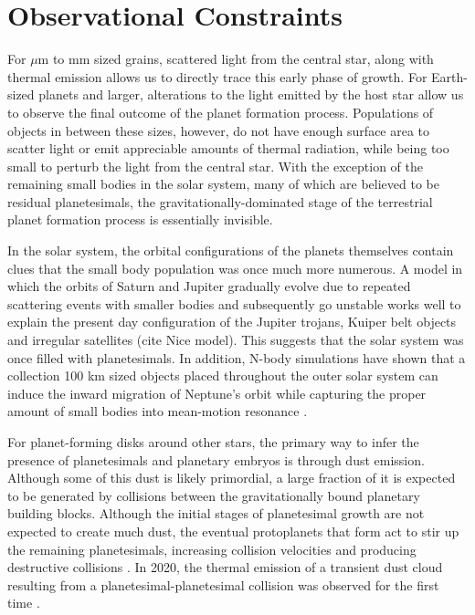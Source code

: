 \section{Observational Constraints}\label{sec:obsConstraints}

For $\mu$m to mm sized grains, scattered light from the central star, along with thermal emission allows us to directly trace this early phase of growth. For Earth-sized planets and larger, alterations to the light emitted by the host star allow us to observe the final outcome of the planet formation process. Populations of objects in between these sizes, however, do not have enough surface area to scatter light or emit appreciable amounts of thermal radiation, while being too small to perturb the light from the central star. With the exception of the remaining small bodies in the solar system, many of which are believed to be residual planetesimals, the gravitationally-dominated stage of the terrestrial planet formation process is essentially invisible.

In the solar system, the orbital configurations of the planets themselves contain clues that the small body population was once much more numerous. A model in which the orbits of Saturn and Jupiter gradually evolve due to repeated scattering events with smaller bodies and subsequently go unstable works well to explain the present day configuration of the Jupiter trojans, Kuiper belt objects and irregular satellites (cite Nice model). This suggests that the solar system was once filled with planetesimals. In addition, N-body simulations have shown that a collection 100 km sized objects placed throughout the outer solar system can induce the inward migration of Neptune's orbit while capturing the proper amount of small bodies into mean-motion resonance \cite{murrayclay06}.

For planet-forming disks around other stars, the primary way to infer the presence of planetesimals and planetary embryos is through dust emission. Although some of this dust is likely primordial, a large fraction of it is expected to be generated by collisions between the gravitationally bound planetary building blocks. Although the initial stages of planetesimal growth are not expected to create much dust, the eventual protoplanets that form act to stir up the remaining planetesimals, increasing collision velocities and producing destructive collisions \cite{kenyon04}. In 2020, the thermal emission of a transient dust cloud resulting from a planetesimal-planetesimal collision was observed for the first time \cite{gaspar20}.

